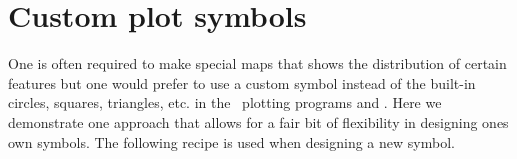 

\section{Custom plot symbols}

One is often required to make special maps that shows the
distribution of certain features but one would prefer to
use a custom symbol instead of the built-in circles,
squares, triangles, etc. in the \GMT\ plotting programs
 and .  Here we demonstrate one
approach that allows for a fair bit of flexibility in
designing ones own symbols.  The following recipe is used
when designing a new symbol.
